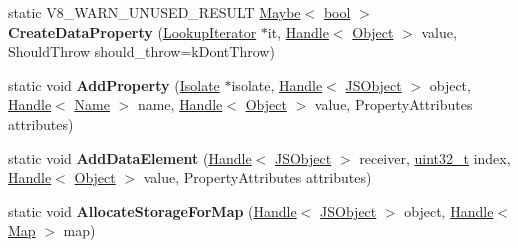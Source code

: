 \begin{DoxyCompactItemize}
\item 
\mbox{\label{classv8_1_1internal_1_1JSObject_ac33f1c90b781690572f2ca2efb27180b}} 
static V8\+\_\+\+W\+A\+R\+N\+\_\+\+U\+N\+U\+S\+E\+D\+\_\+\+R\+E\+S\+U\+LT \mbox{\hyperlink{classv8_1_1Maybe}{Maybe}}$<$ \mbox{\hyperlink{classbool}{bool}} $>$ {\bfseries Create\+Data\+Property} (\mbox{\hyperlink{classv8_1_1internal_1_1LookupIterator}{Lookup\+Iterator}} $\ast$it, \mbox{\hyperlink{classv8_1_1internal_1_1Handle}{Handle}}$<$ \mbox{\hyperlink{classv8_1_1internal_1_1Object}{Object}} $>$ value, Should\+Throw should\+\_\+throw=k\+Dont\+Throw)
\item 
\mbox{\label{classv8_1_1internal_1_1JSObject_aca1c63456ba9dcaa9924736fa82cb74f}} 
static void {\bfseries Add\+Property} (\mbox{\hyperlink{classv8_1_1internal_1_1Isolate}{Isolate}} $\ast$isolate, \mbox{\hyperlink{classv8_1_1internal_1_1Handle}{Handle}}$<$ \mbox{\hyperlink{classv8_1_1internal_1_1JSObject}{J\+S\+Object}} $>$ object, \mbox{\hyperlink{classv8_1_1internal_1_1Handle}{Handle}}$<$ \mbox{\hyperlink{classv8_1_1internal_1_1Name}{Name}} $>$ name, \mbox{\hyperlink{classv8_1_1internal_1_1Handle}{Handle}}$<$ \mbox{\hyperlink{classv8_1_1internal_1_1Object}{Object}} $>$ value, Property\+Attributes attributes)
\item 
\mbox{\label{classv8_1_1internal_1_1JSObject_a92bd2c1a5c7797a9e8d4dd7d8f4a82ba}} 
static void {\bfseries Add\+Data\+Element} (\mbox{\hyperlink{classv8_1_1internal_1_1Handle}{Handle}}$<$ \mbox{\hyperlink{classv8_1_1internal_1_1JSObject}{J\+S\+Object}} $>$ receiver, \mbox{\hyperlink{classuint32__t}{uint32\+\_\+t}} index, \mbox{\hyperlink{classv8_1_1internal_1_1Handle}{Handle}}$<$ \mbox{\hyperlink{classv8_1_1internal_1_1Object}{Object}} $>$ value, Property\+Attributes attributes)
\item 
\mbox{\label{classv8_1_1internal_1_1JSObject_a03637647218c927f73ff61a2a94318ba}} 
static void {\bfseries Allocate\+Storage\+For\+Map} (\mbox{\hyperlink{classv8_1_1internal_1_1Handle}{Handle}}$<$ \mbox{\hyperlink{classv8_1_1internal_1_1JSObject}{J\+S\+Object}} $>$ object, \mbox{\hyperlink{classv8_1_1internal_1_1Handle}{Handle}}$<$ \mbox{\hyperlink{classv8_1_1internal_1_1Map}{Map}} $>$ map)
\item 
\mbox{\label{classv8_1_1internal_1_1JSObject_aecc850e35fb6912ed2d5b786abad1f64}} 

\end{DoxyCompactItemize}
